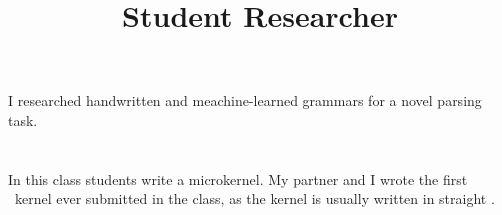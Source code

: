 \begin{resume}
% 
% 
\title{Student Researcher}
\begin{position}
I researched handwritten and meachine-learned grammars for a novel parsing task.
\end{position}
 


\section{}
In this class students write a microkernel. My partner and I wrote the first
\kw{\Cplusplus}\ kernel ever submitted in the class, as the kernel is
usually written in straight .


\end{resume}
